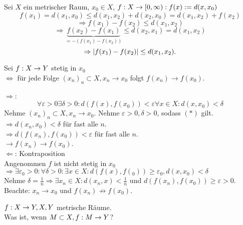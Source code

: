 \documentclass[../ana2.tex]{subfiles}
\begin{document}
\begin{bsp}
    Sei \(X\) ein metrischer Raum, \(x_0 \in X\),
    \( f:X\rightarrow [0, \infty): f(x) := d(x,x_0) \)
    \[ f(x_1) = d(x_1, x_0) \leq d(x_1, x_2) + d(x_2, x_0)
    = d(x_1, x_2) + f(x_2) \]
    \[ \Rightarrow f(x_1) - f(x_2) \leq d(x_1, x_2) \]
    \[ \Rightarrow \underbrace{f(x_2) - f(x_1)}_{
        = -(f(x_1) - f(x_2))
    } \leq d(x_2, x_1) = d(x_1, x_2) \]
    \[ \Rightarrow \left| f(x_1) - f(x_2) \right| 
    \leq d(x_1, x_2). \]
\end{bsp}
\begin{defi}
    Sei \( f:X\rightarrow Y \) stetig in \(x_0\)\\
    \( \Leftrightarrow \) für jede Folge 
    \( (x_n)_n \subset X, x_n \rightarrow x_0 \) 
    folgt \( f(x_n) \rightarrow f(x_0) \).
\end{defi}
\begin{bew}
    \( \Rightarrow \): 
    \[ \forall \varepsilon >0
    \exists \delta >0: d(f(x), f(x_0)) < \varepsilon
    \forall x \in X: d(x, x_0) < \delta \tag{\(*\)} \]
    Nehme \( (x_n)_n \subset X, x_n \rightarrow x_0 \).
    Nehme \( \varepsilon > 0, \delta > 0 \), sodass 
    \((*)\) gilt.
    \( \Rightarrow d(x_n, x_0) < \delta \) für fast 
    alle \(n\).\\
    \( \Rightarrow d(f(x_n), f(x_0)) < \varepsilon \) 
    für fast alle \(n\).\\
    \( \rightarrow f(x_n) \rightarrow f(x_0) \). \\
    \( \Leftarrow \): Kontraposition \\
    Angenommen \(f\) ist nicht stetig in \(x_0\)
    \( \Rightarrow \exists \varepsilon_0 > 0: 
    \forall \delta >0: \exists x\in X: 
    d(f(x),f(_0)) \geq \varepsilon_0, d(x,x_0) < \delta \) \\
    Nehme \( \delta = \frac{1}{n} \Rightarrow \exists 
    x_n \in X: d(x_n, x) < \frac{1}{n} \) und 
    \( d(f(x_n), f(x_0)) \geq \varepsilon > 0 \).
    Beachte: \(x_n \rightarrow x_0\) und 
    \(f(x_n) \not \rightarrow f(x_0) \).
\end{bew}
\( f:X\rightarrow Y, X, Y \) metrische Räume. \\
Was ist, wenn \(M \subset X, f:M\rightarrow Y\)?
\end{document}
